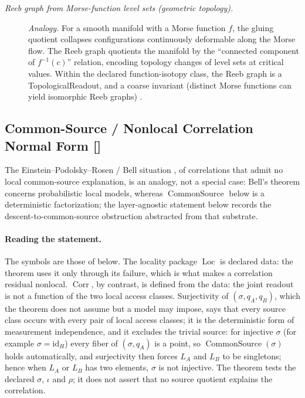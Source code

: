 \begin{description}
\item[\emph{Reeb graph from {M}orse-function level
sets (geometric topology).}] \textit{Analogy.}
For a smooth manifold with a Morse function \(f\),
the gluing quotient collapses configurations
continuously deformable along the Morse flow.  The
Reeb graph quotients the manifold by the
``connected component of \(f^{-1}(c)\)'' relation,
encoding topology changes of level sets at
critical values.  Within the declared
function-isotopy class, the Reeb graph is a
TopologicalReadout, and a coarse invariant
(distinct Morse functions can yield isomorphic
Reeb graphs) \citep{Reeb1946Points}.
\end{description}
\endgroup

\subsection{Common-Source / Nonlocal Correlation Normal Form [\texorpdfstring{}{F49}]}\label{sec:self-reference-limits:common-source}

The Einstein--Podolsky--Rosen / Bell situation \citep{Bell1964EPR}, of correlations that admit no local common-source explanation, is an analogy, not a special case: Bell's theorem concerns probabilistic local models, whereas \(\operatorname{CommonSource}\) below is a deterministic factorization; the layer-agnostic statement below
records the descent-to-common-source obstruction abstracted from
that substrate.

\paragraph{Reading the statement.} The symbols are those of  below.
The locality package \(\operatorname{Loc}\) is declared data: the
theorem uses it only through its failure, which is what makes a
correlation residual nonlocal. \(\operatorname{Corr}\), by contrast, is defined from the
data: the joint readout is not a function of the two local access classes. Surjectivity of \((\sigma,q_A,q_B)\), which the theorem does not assume but a model may impose, says that every source class occurs with every pair of local access classes; it is the deterministic
form of measurement independence, and it excludes
the trivial source: for injective \(\sigma\) (for example
\(\sigma=\mathrm{id}_H\)) every fiber of \((\sigma,q_A)\) is a point, so
\(\operatorname{CommonSource}(\sigma)\) holds automatically, and surjectivity
then forces \(L_A\) and \(L_B\) to be singletons; hence when \(L_A\) or \(L_B\)
has two elements, \(\sigma\) is not injective. The
theorem tests the declared \(\sigma\), \(\iota\) and \(\rho\); it does not
assert that no source quotient explains the correlation.

